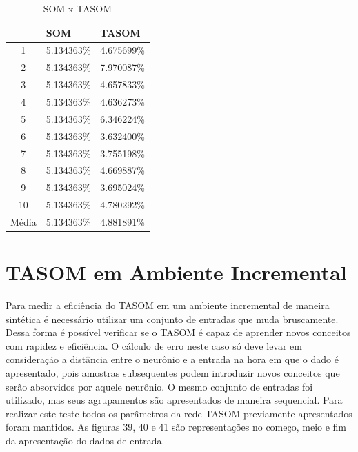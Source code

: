 \begin{table}[h]
\centering
\caption{SOM x TASOM}
\label{comp}
\begin{tabular}{c|l|l|}
\cline{2-3}
                            & SOM      & TASOM    \\ \hline
\multicolumn{1}{|c|}{1}     & 5.134363\% & 4.675699\% \\ \hline
\multicolumn{1}{|c|}{2}     & 5.134363\% & 7.970087\% \\ \hline
\multicolumn{1}{|c|}{3}     & 5.134363\% & 4.657833\% \\ \hline
\multicolumn{1}{|c|}{4}     & 5.134363\% & 4.636273\% \\ \hline
\multicolumn{1}{|c|}{5}     & 5.134363\% & 6.346224\% \\ \hline
\multicolumn{1}{|c|}{6}     & 5.134363\% & 3.632400\% \\ \hline
\multicolumn{1}{|c|}{7}     & 5.134363\% & 3.755198\% \\ \hline
\multicolumn{1}{|c|}{8}     & 5.134363\% & 4.669887\% \\ \hline
\multicolumn{1}{|c|}{9}     & 5.134363\% & 3.695024\% \\ \hline
\multicolumn{1}{|c|}{10}    & 5.134363\% & 4.780292\% \\ \hline
\multicolumn{1}{|l|}{Média} & 5.134363\% & 4.881891\% \\ \hline
\end{tabular}
\end{table}

\section{TASOM em Ambiente Incremental}
Para medir a eficiência do TASOM em um ambiente incremental de maneira sintética é necessário utilizar um conjunto de entradas que muda bruscamente. Dessa forma é possível verificar se o TASOM é capaz de aprender novos conceitos com rapidez e eficiência. O cálculo de erro neste caso só deve levar em consideração a distância entre o neurônio e a entrada na hora em que o dado é apresentado, pois amostras subsequentes podem introduzir novos conceitos que serão absorvidos por aquele neurônio. O mesmo conjunto de entradas foi utilizado, mas seus agrupamentos são apresentados de maneira sequencial. Para realizar este teste todos os parâmetros da rede TASOM previamente apresentados foram mantidos. As figuras 39, 40 e 41 são representações no começo, meio e fim da apresentação do dados de entrada.


